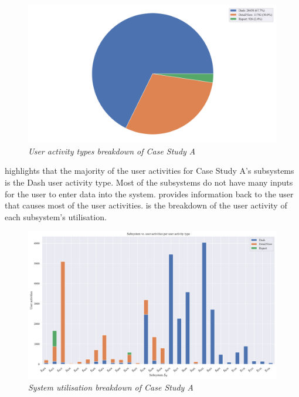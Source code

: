 \begin{figure}[!htb]
	\centering %
	\includegraphics[width=0.95\linewidth]{img/ch3/analysis/case_A_breakdown.pdf}
	\caption[User activity types breakdown of Case Study A]
	{\textit{User activity types breakdown of Case Study A}}\label{fig:ch3_caseABreakdown}
\end{figure} 

 highlights that the majority of the user activities for Case Study A's subsystems is the Dash user activity type. Most of the subsystems do not have many inputs for the user to enter data into the system.  provides information back to the user that causes most of the user activities.  is the breakdown of the user activity of each subsystem's utilisation.

\begin{figure}[!htb]
	\centering %
	\includegraphics[width=0.95\linewidth]{img/ch3/analysis/case_A_subsystems_1.pdf}
	\caption[System utilisation breakdown of Case Study A]
	{\textit{System utilisation breakdown of Case Study A}}\label{fig:ch3_caseAAnalysis}
\end{figure}

